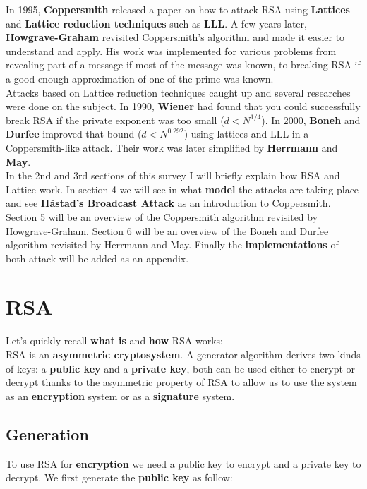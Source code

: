 \documentclass[a4paper,11pt]{article}
\begin{document}
In 1995, \textbf{Coppersmith} released a paper on how to attack RSA using \textbf{Lattices} and \textbf{Lattice reduction techniques} such as \textbf{LLL}. A few years later, \textbf{Howgrave-Graham} revisited Coppersmith's algorithm and made it easier to understand and apply. His work was implemented for various problems from revealing part of a message if most of the message was known, to breaking RSA if a good enough approximation of one of the prime was known.\\
Attacks based on Lattice reduction techniques caught up and several researches were done on the subject. In 1990, \textbf{Wiener} had found that you could successfully break RSA if the private exponent was too small ($d<N^{1/4}$). In 2000, \textbf{Boneh} and \textbf{Durfee} improved that bound ($d<N^{0.292}$) using lattices and LLL in a Coppersmith-like attack. Their work was later simplified by \textbf{Herrmann} and \textbf{May}.\\
In the 2nd and 3rd sections of this survey I will briefly explain how RSA and Lattice work. In section 4 we will see in what \textbf{model} the attacks are taking place and see \textbf{Håstad's Broadcast Attack} as an introduction to Coppersmith. Section 5 will be an overview of the Coppersmith algorithm revisited by Howgrave-Graham. Section 6 will be an overview of the Boneh and Durfee algorithm revisited by Herrmann and May. Finally the \textbf{implementations} of both attack will be added as an appendix.

\section{RSA}\label{rsa}

Let's quickly recall \textbf{what is} and \textbf{how} RSA works:\\
RSA is an \textbf{asymmetric cryptosystem}. A generator algorithm derives two kinds of keys: a \textbf{public key} and a \textbf{private key}, both can be used either to encrypt or decrypt thanks to the asymmetric property of RSA to allow us to use the system as an \textbf{encryption} system or as a \textbf{signature} system.\\

\subsection{Generation}

To use RSA for \textbf{encryption} we need a public key to encrypt and a private key to decrypt. We first generate the \textbf{public key} as follow:\\
\end{document}
